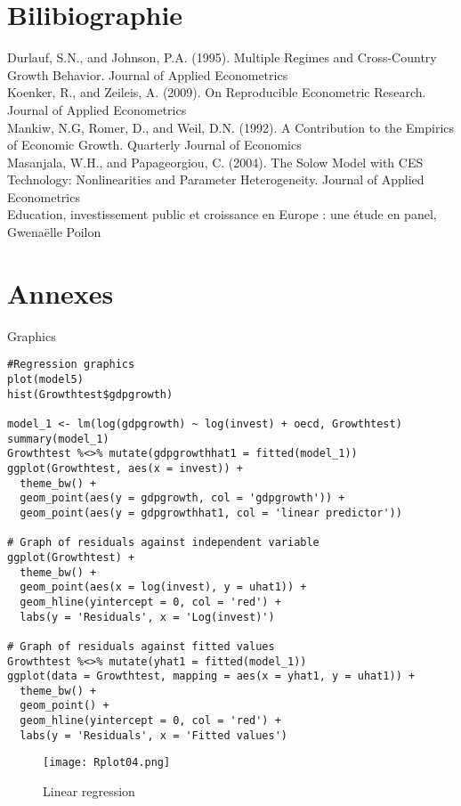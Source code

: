 \documentclass[12pt,fleqn]{report}
\begin{document}
\section*{Bilibiographie}
Durlauf, S.N., and Johnson, P.A. (1995). Multiple Regimes and Cross-Country Growth Behavior. Journal of Applied Econometrics\\
Koenker, R., and Zeileis, A. (2009). On Reproducible Econometric Research. Journal of Applied Econometrics\\
Mankiw, N.G, Romer, D., and Weil, D.N. (1992). A Contribution to the Empirics of Economic Growth. Quarterly Journal of Economics\\
Masanjala, W.H., and Papageorgiou, C. (2004). The Solow Model with CES Technology: Nonlinearities and Parameter Heterogeneity. Journal of Applied Econometrics\\
Education, investissement public et croissance en Europe : une étude en panel, Gwenaëlle Poilon
\\

\newpage
\section*{Annexes}
Graphics
\begin{lstlisting}
#Regression graphics
plot(model5)
hist(Growthtest$gdpgrowth)

model_1 <- lm(log(gdpgrowth) ~ log(invest) + oecd, Growthtest)
summary(model_1)
Growthtest %<>% mutate(gdpgrowthhat1 = fitted(model_1))
ggplot(Growthtest, aes(x = invest)) +
  theme_bw() +
  geom_point(aes(y = gdpgrowth, col = 'gdpgrowth')) +
  geom_point(aes(y = gdpgrowthhat1, col = 'linear predictor'))

# Graph of residuals against independent variable
ggplot(Growthtest) + 
  theme_bw() + 
  geom_point(aes(x = log(invest), y = uhat1)) +
  geom_hline(yintercept = 0, col = 'red') + 
  labs(y = 'Residuals', x = 'Log(invest)')

# Graph of residuals against fitted values
Growthtest %<>% mutate(yhat1 = fitted(model_1))
ggplot(data = Growthtest, mapping = aes(x = yhat1, y = uhat1)) + 
  theme_bw() +
  geom_point() +
  geom_hline(yintercept = 0, col = 'red') + 
  labs(y = 'Residuals', x = 'Fitted values')
\end{lstlisting}

\begin{figure}[h]
  \texttt{[image: Rplot04.png]}
  \caption{Linear regression}
  \label{fig:label_figure}
\end{figure}
\end{document}
